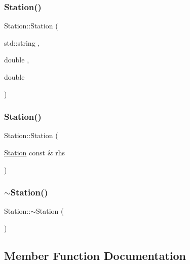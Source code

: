 \mbox{\label{class_station_a93320869206d6fdb35c6b314b03b9dd6}} 
\subsubsection{\texorpdfstring{Station()}{Station()}\hspace{0.1cm}{\footnotesize\ttfamily [3/4]}}
{\footnotesize\ttfamily Station\+::\+Station (\begin{DoxyParamCaption}\item[{std\+::string}]{,  }\item[{double}]{,  }\item[{double}]{ }\end{DoxyParamCaption})}

\mbox{\label{class_station_aadb65bfb700ad2aee7dd4e7f62e40613}} 
\subsubsection{\texorpdfstring{Station()}{Station()}\hspace{0.1cm}{\footnotesize\ttfamily [4/4]}}
{\footnotesize\ttfamily Station\+::\+Station (\begin{DoxyParamCaption}\item[{\mbox{\hyperlink{class_station}{Station}} const \&}]{rhs }\end{DoxyParamCaption})}

\mbox{\label{class_station_a00434e79e8ee7f4ebd6d3b631dde5ac0}} 
\subsubsection{\texorpdfstring{$\sim$\+Station()}{~Station()}}
{\footnotesize\ttfamily Station\+::$\sim$\+Station (\begin{DoxyParamCaption}{ }\end{DoxyParamCaption})\hspace{0.3cm}{\ttfamily [virtual]}}



\subsection{Member Function Documentation}
\mbox{\label{class_station_a0507e4875711fa10696ab05ec8cbc215}} 
